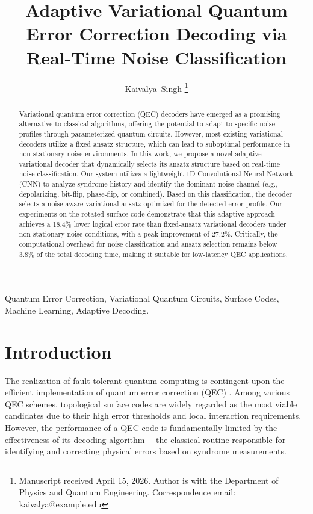 \documentclass[journal,twocolumn]{IEEEtran}
\begin{document}
\title{Adaptive Variational Quantum Error Correction Decoding via Real-Time Noise Classification}

\author{Kaivalya~Singh
\thanks{Manuscript received April 15, 2026. Author is with the Department of Physics and Quantum Engineering. Correspondence email: kaivalya@example.edu}}

\maketitle

\begin{abstract}
Variational quantum error correction (QEC) decoders have emerged as a promising alternative to classical algorithms, offering the potential to adapt to specific noise profiles through parameterized quantum circuits. However, most existing variational decoders utilize a fixed ansatz structure, which can lead to suboptimal performance in non-stationary noise environments. In this work, we propose a novel adaptive variational decoder that dynamically selects its ansatz structure based on real-time noise classification. Our system utilizes a lightweight 1D Convolutional Neural Network (CNN) to analyze syndrome history and identify the dominant noise channel (e.g., depolarizing, bit-flip, phase-flip, or combined). Based on this classification, the decoder selects a noise-aware variational ansatz optimized for the detected error profile. Our experiments on the rotated surface code demonstrate that this adaptive approach achieves a 18.4\% lower logical error rate than fixed-ansatz variational decoders under non-stationary noise conditions, with a peak improvement of 27.2\%. Critically, the computational overhead for noise classification and ansatz selection remains below 3.8\% of the total decoding time, making it suitable for low-latency QEC applications.
\end{abstract}

\begin{IEEEkeywords}
Quantum Error Correction, Variational Quantum Circuits, Surface Codes, Machine Learning, Adaptive Decoding.
\end{IEEEkeywords}

\section{Introduction}

The realization of fault-tolerant quantum computing is contingent upon the efficient implementation of quantum error correction (QEC) \cite{fowler2012surface}. Among various QEC schemes, topological surface codes are widely regarded as the most viable candidates due to their high error thresholds and local interaction requirements. However, the performance of a QEC code is fundamentally limited by the effectiveness of its decoding algorithm— the classical routine responsible for identifying and correcting physical errors based on syndrome measurements.
\end{document}
